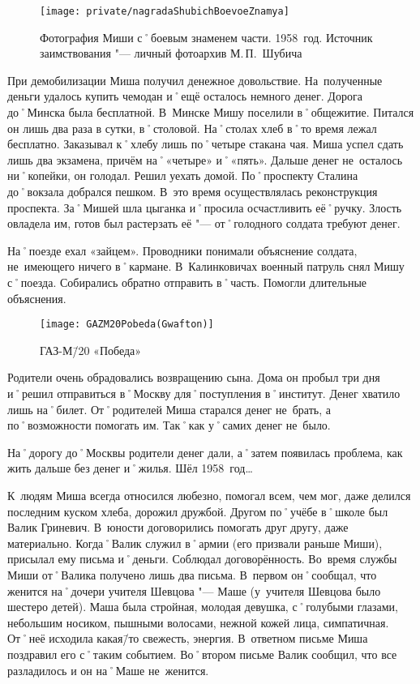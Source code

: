\begin{figure}[h]
\texttt{[image: private/nagradaShubichBoevoeZnamya]}
\caption{Фотография Миши с˚боевым знаменем части. 1958~год. Источник заимствования "--- личный фотоархив М.\,П.~Шубича}
\label{fig:nagradaShubichBoevoeZnamya}
\end{figure}

При демобилизации Миша получил денежное довольствие. На~полученные деньги удалось купить чемодан и˚ещё осталось немного денег. Дорога до˚Минска была бесплатной. В~Минске Мишу поселили в˚общежитие. Питался он лишь два раза в сутки, в˚столовой. На˚столах хлеб в˚то время лежал бесплатно. Заказывал к˚хлебу лишь по˚четыре стакана чая. Миша успел сдать лишь два экзамена, причём на˚«четыре» и˚«пять». Дальше денег не~осталось ни˚копейки, он голодал. Решил уехать домой. По˚проспекту Сталина до˚вокзала добрался пешком. В~это время осуществлялась реконструкция проспекта. За˚Мишей шла цыганка и˚просила осчастливить её˚ручку. Злость овладела им, готов был растерзать её "--- от˚голодного солдата требуют денег.

На˚поезде ехал «зайцем». Проводники понимали объяснение солдата, не~имеющего ничего в˚кармане. В~Калинковичах военный патруль снял Мишу с˚поезда. Собирались обратно отправить в˚часть. Помогли длительные объяснения.

\begin{wrapfigure}{O}{.4\textwidth}
\centering
\texttt{[image: GAZM20Pobeda(Gwafton)]}
\caption[ГАЗ-М\=/20 «Победа»]{ГАЗ-М\=/20 «Победа»\footnotemark}
\label{fig:GAZM20Pobeda(Gwafton)}
\end{wrapfigure}

Родители очень обрадовались возвращению сына. Дома он пробыл три дня и˚решил отправиться в˚Москву для˚поступления в˚институт. Денег хватило лишь на˚билет. От˚родителей Миша старался денег не~брать, а по˚возможности помогать им. Так˚как у˚самих денег не~было.

На˚дорогу до˚Москвы родители денег дали, а˚затем появилась проблема, как жить дальше без денег и˚жилья. Шёл 1958~год… 

К~людям Миша всегда относился любезно, помогал всем, чем мог, даже делился последним куском хлеба, дорожил дружбой. Другом по˚учёбе в˚школе был Валик Гриневич. В~юности договорились помогать друг другу, даже материально. Когда˚Валик служил в˚армии (его призвали раньше Миши), присылал ему письма и˚деньги. Соблюдал договорённость. Во~время службы Миши от˚Валика получено лишь два письма. В~первом он˚сообщал, что женится на˚дочери учителя Шевцова "--- Маше (у~учителя Шевцова было шестеро детей). Маша была стройная, молодая девушка, с˚голубыми глазами, небольшим носиком, пышными волосами, нежной кожей лица, симпатичная. От˚неё исходила какая\=/то свежесть, энергия. В~ответном письме Миша поздравил его с˚таким событием. Во˚втором письме Валик сообщил, что все разладилось и он на˚Маше не~женится.

